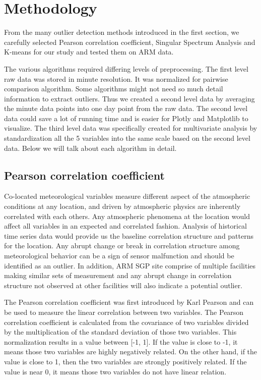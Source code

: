 \section{Methodology}
From the many outlier detection methods introduced in the first section,
we carefully selected Pearson correlation coefficient, Singular
Spectrum Analysis and K-means for our study and tested them on ARM data. 

The various algorithms required differing levels of preprocessing. The
first level raw data was stored in minute resolution. It was normalized
for pairwise comparison algorithm. Some algorithms might not need
so much detail information to extract outliers. Thus we created a
second level data by averaging the minute data points into one
day point from the raw data. The second level data could save a lot
of running time and is easier for Plotly \cite{plotly} and
Matplotlib \cite{Hunter:2007} to visualize. The third level data
was specifically created for multivariate analysis by standardization
all the 5 variables into the same scale based on the second level
data. Below we will talk about each algorithm in detail. 

\subsection{Pearson correlation coefficient}
Co-located meteorological variables measure different aspect of the
atmospheric conditions at any location, and driven by atmospheric physics
are inherently correlated with each others. Any atmospheric phenomena at
the location would affect all variables in an expected
and correlated fashion.  Analysis of historical time
series data would provide us the baseline correlation structure and
patterns for the location. Any abrupt change or break in
correlation structure among meteorological behavior can be a sign of
sensor malfunction and should be identified as an outlier. In addition,
ARM SGP site comprise of multiple facilities making similar sets of
measurement and any abrupt change in correlation structure not observed
at other facilities will also indicate a potential outlier.

The Pearson correlation coefficient was first introduced by Karl
Pearson\cite{pearson1895note} and can be used to measure the linear
correlation between two variables. The Pearson correlation coefficient
is calculated from the covariance of two variables divided by the
multiplication of the standard deviation of those two variables. This
normalization results in a value between [-1, 1]. If the value is close
to -1, it means those two variables are highly negatively related. On
the other hand, if the value is close to 1, then the two variables are strongly positively related.
If the value is near 0, it means those two variables do not have linear
relation. 

